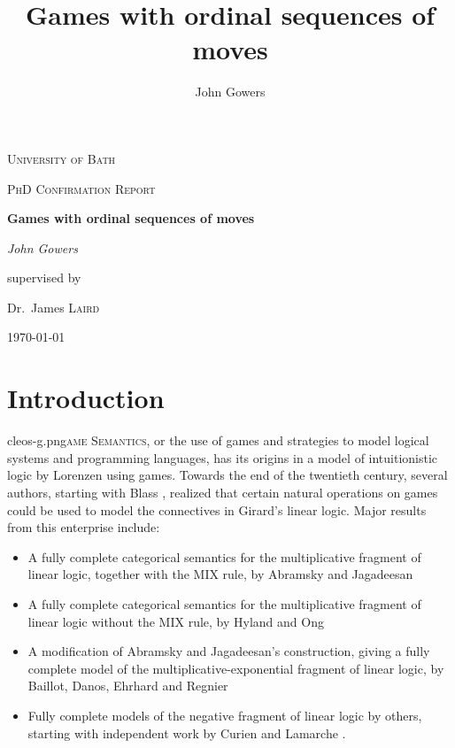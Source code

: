 \documentclass[11pt]{article} %
\title{Games with ordinal sequences of moves}
\author{John Gowers}
\date{}
\theoremstyle{plain} %
\theoremstyle{definition} %
\theoremstyle{note}
\theoremstyle{exercisestyle}
\begin{document}
\begin{titlepage} %
	\centering
	{\scshape\LARGE University of Bath \par}
	\vspace{1cm}
	{\scshape\Large PhD Confirmation Report \par}
	\vspace{1.5cm}
	{\huge\bfseries Games with ordinal sequences of moves \par}
	\vspace{2cm}
	{\Large\itshape John Gowers \par}
	\vfill
	supervised by\par
	Dr.~James \textsc{Laird}

	\vfill

	{\large \today\par}
\end{titlepage}

\tableofcontents
\thispagestyle{empty}

\setcounter{tocdepth}{2}

\section{Introduction}

\lettrine[image=true, lines=6, findent=3pt, nindent=0pt]{cleos-g.png}{ame Semantics}, or the use of games and strategies to model logical systems and programming languages, has its origins in a model of intuitionistic logic by Lorenzen \cite{lorenzengames} using games.  Towards the end of the twentieth century, several authors, starting with Blass \cite{blassgames}, realized that certain natural operations on games could be used to model the connectives in Girard's linear logic.  Major results from this enterprise include:
\begin{itemize}
  \item A fully complete categorical semantics for the multiplicative fragment of linear logic, together with the MIX rule, by Abramsky and Jagadeesan \cite{abramskyjagadeesangames}
  \item A fully complete categorical semantics for the multiplicative fragment of linear logic without the MIX rule, by Hyland and Ong \cite{HylandOngGames}
  \item A modification of Abramsky and Jagadeesan's construction, giving a fully complete model of the multiplicative-exponential fragment of linear logic, by Baillot, Danos, Ehrhard and Regnier \cite{bion}
  \item Fully complete models of the negative fragment of linear logic by others, starting with independent work by Curien \cite{curiengames} and Lamarche \cite{lamarchegames}.  
\end{itemize}
\end{document}
